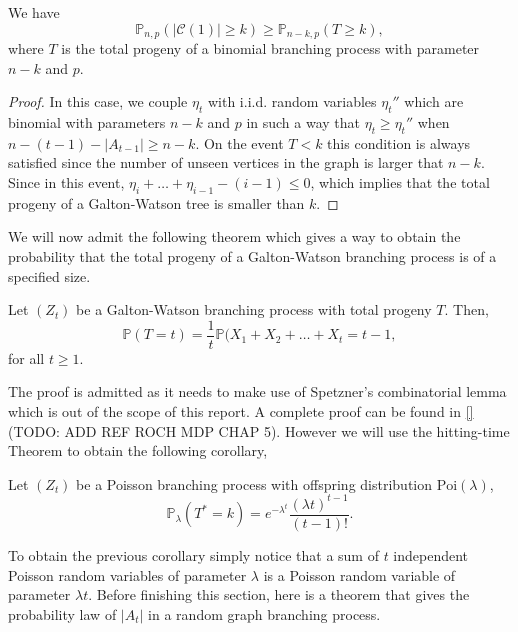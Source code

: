 \begin{theorem}\label{th:lowbin}
	We have
	\begin{equation}
		\mathbb{P}_{n,p}(|\mathcal{C}(1)| \geq k) \geq \mathbb{P}_{n-k,p}(T\geq k),
	\end{equation}
	where $T$ is the total progeny of a binomial branching process with parameter $n-k$ and $p$.
\end{theorem}
\begin{proof}
	In this case, we couple $\eta_t$ with i.i.d. random variables $\eta_t''$ which are binomial with parameters $n-k$ and $p$ in such a way that $\eta_t \geq \eta_t''$ when $n-(t-1)-|A_{t-1}| \geq n-k$.
	On the event $T<k$ this condition is always satisfied since the number of unseen vertices in the graph is larger that $n-k$. 
	Since in this event, $\eta_i + \ldots + \eta_{i-1} - (i-1) \leq 0$, which implies that the total progeny of a Galton-Watson tree is smaller than $k$.
\end{proof}
We will now admit the following theorem which gives a way to obtain the probability that the total progeny of a Galton-Watson branching process is of a specified size.
\begin{theorem}
	Let $(Z_t)$ be a Galton-Watson branching process with total progeny $T$. Then,
	\begin{equation}
		\mathbb{P}(T = t) = \frac{1}{t} \mathbb{P}(X_1 + X_2 + \ldots + X_t = t-1,
	\end{equation}
	for all $t\geq 1$.
\end{theorem}
The proof is admitted as it needs to make use of Spetzner's combinatorial lemma which is out of the scope of this report. 
A complete proof can be found in \ref{} (TODO: ADD REF ROCH MDP CHAP 5).
\newline
However we will use the hitting-time Theorem to obtain the following corollary,
\begin{corollary}\label{th:sizePoi}
	Let $(Z_t)$ be a Poisson branching process with offspring distribution $\text{Poi}(\lambda)$,
	\begin{equation}
		\mathbb{P}_{\lambda}(T^* = k) = e^{-\lambda^t}\frac{(\lambda t)^{t-1}}{(t-1)!}.
	\end{equation}
\end{corollary}
To obtain the previous corollary simply notice that a sum of $t$ independent Poisson random variables of parameter $\lambda$ is a Poisson random variable of parameter $\lambda t$.
Before finishing this section, here is a theorem that gives the probability law of $|A_t|$ in a random graph branching process.
